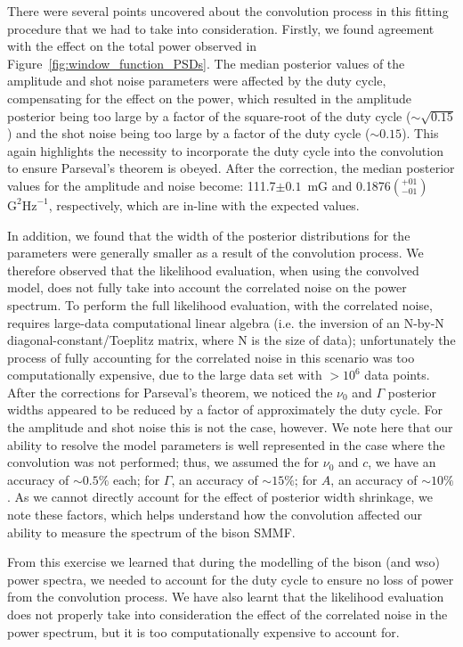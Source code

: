 There were several points uncovered about the convolution process in this fitting procedure that we had to take into consideration. Firstly, we found agreement with the effect on the total power observed in Figure~\ref{fig:window_function_PSDs}. The median posterior values of the amplitude and shot noise parameters were affected by the duty cycle, compensating for the effect on the power, which resulted in the amplitude posterior being too large by a factor of the square-root of the duty cycle ($\sim \sqrt{0.15}$) and the shot noise being too large by a factor of the duty cycle ($\sim 0.15$). This again highlights the necessity to incorporate the duty cycle into the convolution to ensure Parseval's theorem is obeyed. After the correction, the median posterior values for the amplitude and noise become: 111.7$\pm0.1$~mG and 0.1876$\left(_{-01}^{+01}\right)$~$\mathrm{G}^2\mathrm{Hz}^{-1}$, respectively, which are in-line with the expected values.

In addition, we found that the width of the posterior distributions for the parameters were generally smaller as a result of the convolution process. We therefore observed that the likelihood evaluation, when using the convolved model, does not fully take into account the correlated noise on the power spectrum. To perform the full likelihood evaluation, with the correlated noise, requires large-data computational linear algebra (i.e. the inversion of an N-by-N diagonal-constant/Toeplitz matrix, where N is the size of data); unfortunately the process of fully accounting for the correlated noise in this scenario was too computationally expensive, due to the large data set with $> 10^6$ data points. After the corrections for Parseval's theorem, we noticed the $\nu_0$ and $\Gamma$ posterior widths appeared to be reduced by a factor of approximately the duty cycle. For the amplitude and shot noise this is not the case, however. We note here that our ability to resolve the model parameters is well represented in the case where the convolution was not performed; thus, we assumed the for $\nu_0$ and $c$, we have an accuracy of $\sim 0.5\%$ each; for $\Gamma$, an accuracy of $\sim 15\%$; for $A$, an accuracy of $\sim 10\%$. As we cannot directly account for the effect of posterior width shrinkage, we note these factors, which helps understand how the convolution affected our ability to measure the spectrum of the \gls{bison} SMMF.

From this exercise we learned that during the modelling of the \gls{bison} (and \gls{wso}) power spectra, we needed to account for the duty cycle to ensure no loss of power from the convolution process. We have also learnt that the likelihood evaluation does not properly take into consideration the effect of the correlated noise in the power spectrum, but it is too computationally expensive to account for.



